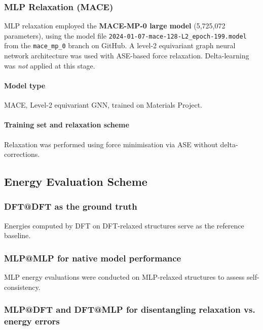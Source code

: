 \subsubsection{MLP Relaxation (MACE)}

MLP relaxation employed the \textbf{MACE-MP-0 large model} (5,725,072 parameters), using the model file
\texttt{2024-01-07-mace-128-L2\_epoch-199.model} from the \texttt{mace\_mp_0} branch on GitHub. A level-2 equivariant
graph neural network architecture was used with ASE-based force relaxation. Delta-learning was \emph{not} applied at
this stage.

\paragraph{Model type}

MACE, Level-2 equivariant GNN, trained on Materials Project.

\paragraph{Training set and relaxation scheme}

Relaxation was performed using force minimisation via ASE without delta-corrections.


\subsection{Energy Evaluation Scheme}

\subsubsection{DFT@DFT as the ground truth}

Energies computed by DFT on DFT-relaxed structures serve as the reference baseline.

\subsubsection{MLP@MLP for native model performance}

MLP energy evaluations were conducted on MLP-relaxed structures to assess self-consistency.

\subsubsection{MLP@DFT and DFT@MLP for disentangling relaxation vs. energy errors}

